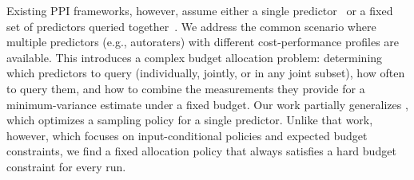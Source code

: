 \documentclass{article} %
\renewcommand{\cite}{\citep}
\begin{document}
Existing PPI frameworks, however, assume either a single predictor~\cite{angelopoulos2023prediction, angelopoulos2023ppi++} or a fixed set of predictors queried together~\cite{miao2024assumptionleandataadaptivepostpredictioninference}. We address the common scenario where multiple predictors (e.g., autoraters) with different cost-performance profiles are available. This introduces a complex budget allocation problem: determining which  predictors to query (individually, jointly, or in any joint subset), how often to query them, and how to combine the measurements they provide for a minimum-variance estimate under a fixed budget. Our work partially generalizes \citet{angelopoulos2025costoptimalactiveaimodel}, which optimizes a sampling policy for a single predictor. Unlike that work, however, which focuses on input-conditional policies and expected budget constraints, we find a fixed allocation policy that always satisfies a hard budget constraint for every run.


\end{document}
